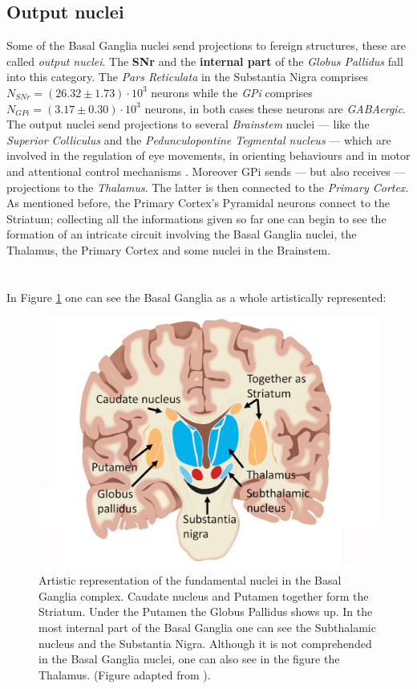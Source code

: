 \documentclass[MSc,english]{Container/thesistemplate}
\begin{document}
\subsection*{Output nuclei}
Some of the Basal Ganglia nuclei send projections to fereign structures, these are called \emph{output nuclei}. The \textbf{SNr} and the \textbf{internal part} of the \emph{Globus Pallidus} fall into this category. The \emph{Pars Reticulata} in the Substantia Nigra comprises $N_{SNr} = (26.32 \pm 1.73) \cdot 10^{3}$ neurons \cite{oorschot} while the \emph{GPi} comprises $N_{GPi} = (3.17 \pm 0.30) \cdot 10^{3}$ neurons, \cite{oorschot} in both cases these neurons are \emph{GABAergic}.
\\ The output nuclei send projections to several \emph{Brainstem} nuclei --- like the \emph{Superior Colliculus} and the \emph{Pedunculopontine Tegmental nucleus} --- which are involved in the regulation of eye movements, in orienting behaviours and in motor and attentional control mechanisms \cite{nelsonkreitzer}. Moreover GPi sends --- but also receives --- projections to the \emph{Thalamus}. The latter is then connected to the \emph{Primary Cortex}. 
\\ As mentioned before, the Primary Cortex's Pyramidal neurons connect to the Striatum; collecting all the informations given so far one can begin to see the formation of an intricate circuit involving the Basal Ganglia nuclei, the Thalamus, the Primary Cortex and some nuclei in the Brainstem.
\\
\\
\\
In Figure \ref{fig:bgnuclei} one can see the Basal Ganglia as a whole artistically represented:

\begin{figure}[ht!]
    \centering
    \includegraphics[scale=.3]{Images/bgnuclei.jpg}
    \caption{Artistic representation of the fundamental nuclei in the Basal Ganglia complex. Caudate nucleus and Putamen together form the Striatum. Under the Putamen the Globus Pallidus shows up. In the most internal part of the Basal Ganglia one can see the Subthalamic nucleus and the Substantia Nigra. Although it is not comprehended in the Basal Ganglia nuclei, one can also see in the figure the Thalamus. (Figure adapted from \cite{bgnuclei}).}
    \label{fig:bgnuclei}
\end{figure}
\end{document}
